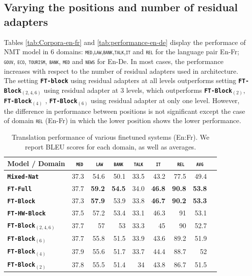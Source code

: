 \documentclass[11pt,a4paper]{article}
\newcommand{\fyTodo}[1]{\Todo[FY:]{\textcolor{orange}{#1}}}
\newcommand{\domain}[1]{\texttt{\textsc{#1}}}
\newcommand{\system}[1]{\texttt{\textbf{#1}}}
\newcommand{\SB}[1]{\textbf{#1}}
\begin{document}
\subsection{Varying the positions and number of residual adapters}

Tables \ref{tab:Corpora-en-fr} and \ref{tab:performance-en-de} display the performace of NMT model in 6 domains: \domain{med},\domain{law},\domain{bank},\domain{talk},\domain{it} and \domain{rel} for the language pair En-Fr; \domain{gouv}, \domain{eco}, \domain{tourism}, \domain{bank}, \domain{med} and \domain{news} for En-De. In most cases, the performance increases with respect to the number of residual adapters used in architecture. The setting \system{FT-block} using residual adapters at all levels outperforms setting \system{FT-Block$_{(2,4,6)}$} using residual adapter at 3 levels, which outperforms \system{FT-Block$_{(2)}$}, \system{FT-Block$_{(4)}$} , \system{FT-Block$_{(6)}$} using residual adapter at only one level. However, the difference in performance between positions is not significant except the case of domain \domain{rel} (En-Fr) in which the lower position shows the lower performance.\fyTodo{What does bold mean ?}\fyTodo{Number of parameters ?} 
\begin{table}
  \centering
  \begin{tabular}{|p{3cm}|*{8}{r|}} \hline
    Model / Domain & \multicolumn{1}{c|}{\domain{ med}} & \multicolumn{1}{c|}{\domain{ law}} & \multicolumn{1}{c|}{\domain{bank}} & \multicolumn{1}{c|}{\domain{talk}} & \multicolumn{1}{c|}{\domain{ it }} & \multicolumn{1}{c|}{\domain{ rel}} & \multicolumn{1}{c|}{\domain{avg}} \\ \hline %
    \system{Mixed-Nat}  & 37.3 & 54.6 & 50.1 & 33.5 & 43.2 & 77.5  & 49.4 \\
    \system{FT-Full}       & 37.7 & \SB{59.2} & \SB{54.5} & 34.0 & \SB{46.8} & \SB{90.8} & \SB{53.8} \\
    \system{FT-Block}     & 37.3 & \SB{57.9} & 53.9 & 33.8 & \SB{46.7} & \SB{90.2} & \SB{53.3} \\ 
    \system{FT-HW-Block}   & 37.5 & 57.2 & 53.4 & 33.1 & 46.3 & 91 & 53.1 \\ 
    \system{FT-Block$_{(2,4,6)}$}     & 37.7 & 57 & 53 & 33.3 & 45 & 90 & 52.7 \\
    \system{FT-Block$_{(6)}$}     & 37.7 & 55.8 & 51.5 & 33.9 & 43.6 & 89.2 & 51.9 \\
    \system{FT-Block$_{(4)}$}     & 37.9 & 55.6 & 51.7 & 33.7 & 44.4 & 88.7 & 52 \\
   \system{FT-Block$_{(2)}$}     & 37.8 & 55.5 & 51.4 & 34 & 43.8 & 86.7 & 51.5 \\
     \hline
  \end{tabular}
  \caption{Translation performance of various finetuned systems (En:Fr). We report BLEU scores for each domain, as well as averages.}
  \label{tab:performance-en-fr}
\end{table}
\end{document}
